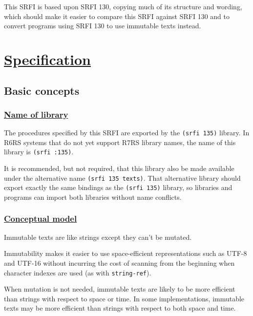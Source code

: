 This SRFI is based upon SRFI 130, copying much of its structure and
wording, which should make it easier to compare this SRFI against SRFI
130 and to convert programs using SRFI 130 to use immutable texts
instead.

\section{\texorpdfstring{\href{}{Specification}}{Specification}}\label{specification}

\subsection{Basic concepts}\label{basic-concepts}

\subsubsection{\texorpdfstring{\href{}{Name of
library}}{Name of library}}\label{name-of-library}

The procedures specified by this SRFI are exported by the
\texttt{(srfi\ 135)} library. In R6RS systems that do not yet support
R7RS library names, the name of this library is \texttt{(srfi\ :135)}.

It is recommended, but not required, that this library also be made
available under the alternative name \texttt{(srfi\ 135\ texts)}. That
alternative library should export exactly the same bindings as the
\texttt{(srfi\ 135)} library, so libraries and programs can import both
libraries without name conflicts.

\subsubsection{\texorpdfstring{\href{}{Conceptual
model}}{Conceptual model}}\label{conceptual-model}

Immutable texts are like strings except they can't be mutated.

Immutability makes it easier to use space-efficient representations such
as UTF-8 and UTF-16 without incurring the cost of scanning from the
beginning when character indexes are used (as with \texttt{string-ref}).

When mutation is not needed, immutable texts are likely to be more
efficient than strings with respect to space or time. In some
implementations, immutable texts may be more efficient than strings with
respect to both space and time.

